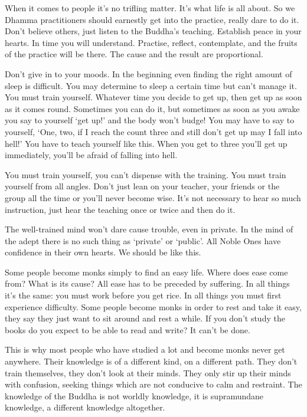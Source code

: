 When it comes to people it's no trifling matter. It's what life is all about. So we Dhamma practitioners should earnestly get into the practice, really dare to do it. Don't believe others, just listen to the Buddha's teaching. Establish peace in your hearts. In time you will understand. Practise, reflect, contemplate, and the fruits of the practice will be there. The cause and the result are proportional. 

Don't give in to your moods. In the beginning even finding the right amount of sleep is difficult. You may determine to sleep a certain time but can't manage it. You must train yourself. Whatever time you decide to get up, then get up as soon as it comes round. Sometimes you can do it, but sometimes as soon as you awake you say to yourself `get up!' and the body won't budge! You may have to say to yourself, `One, two, if I reach the count three and still don't get up may I fall into hell!' You have to teach yourself like this. When you get to three you'll get up immediately, you'll be afraid of falling into hell. 

You must train yourself, you can't dispense with the training. You must train yourself from all angles. Don't just lean on your teacher, your friends or the group all the time or you'll never become wise. It's not necessary to hear so much instruction, just hear the teaching once or twice and then do it. 

The well-trained mind won't dare cause trouble, even in private. In the mind of the adept there is no such thing as `private' or `public'. All Noble Ones have confidence in their own hearts. We should be like this. 

Some people become monks simply to find an easy life. Where does ease come from? What is its cause? All ease has to be preceded by suffering. In all things it's the same: you must work before you get rice. In all things you must first experience difficulty. Some people become monks in order to rest and take it easy, they say they just want to sit around and rest a while. If you don't study the books do you expect to be able to read and write? It can't be done. 

This is why most people who have studied a lot and become monks never get anywhere. Their knowledge is of a different kind, on a different path. They don't train themselves, they don't look at their minds. They only stir up their minds with confusion, seeking things which are not conducive to calm and restraint. The knowledge of the Buddha is not worldly knowledge, it is supramundane knowledge, a different knowledge altogether. 

